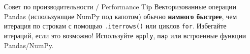 \begin{alerttextbox}{Совет по производительности / Performance Tip}
Векторизованные операции Pandas (использующие NumPy под капотом) обычно \textbf{намного быстрее}, чем итерация по строкам с помощью \texttt{.iterrows()} или циклов \texttt{for}. Избегайте итераций, если это возможно! Используйте \texttt{apply}, \texttt{map} или встроенные функции Pandas/NumPy.
\end{alerttextbox}